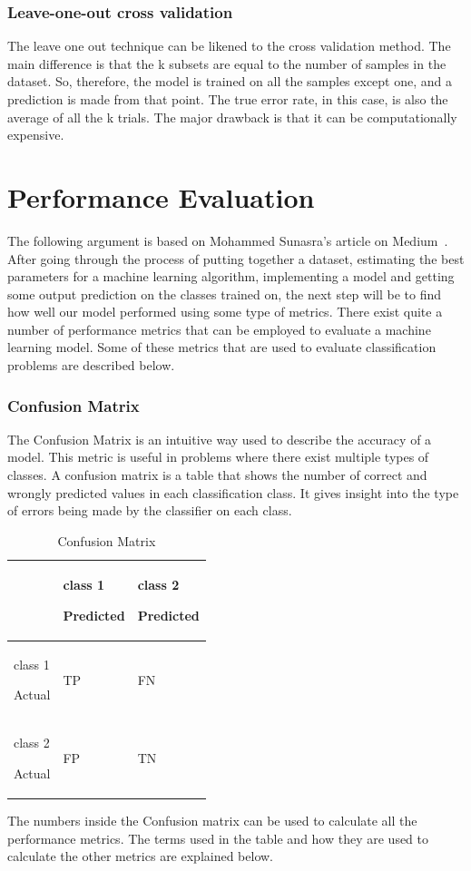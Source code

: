 \documentclass[12pt, a4paper,oneside]{report}
\begin{document}
\subsubsection{Leave-one-out cross validation}
The leave one out technique can be likened to the cross validation method. The main difference is that the k subsets are equal to the number of samples in the dataset. So, therefore, the model is trained on all the samples except one, and a prediction is made from that point. The true error rate, in this case, is also the average of all the k trials. The major drawback is that it can be computationally expensive.


\section{Performance Evaluation}
The following argument is based on Mohammed Sunasra's article on Medium~\cite{performance}.
After going through the process of putting together a dataset, estimating the best parameters for a machine learning algorithm, implementing a model and getting some output prediction on the classes trained on, the next step will be to find how well our model performed using some type of metrics. There exist quite a number of performance metrics that can be employed to evaluate a machine learning model. Some of these metrics that are used to evaluate classification problems are described below.

\subsubsection{Confusion Matrix}
The Confusion Matrix is an intuitive way used to describe the accuracy of a model. This metric is useful in problems where there exist multiple types of classes. A confusion matrix is a table that shows the number of correct and wrongly predicted values in each classification class. It gives insight into the type of errors being made by the classifier on each class.


\begin{table}[h]
	\centering {} \small
	\begin{tabular}{|p{3cm}|p{3cm}|p{3cm}|}
		\hline
		  & class 1 \par Predicted & class 2 \par Predicted \\ \hline
		class 1 \par Actual & TP & FN \\ \hline
		class 2 \par Actual & FP & TN \\ \hline
			
	\end{tabular}
	\caption {Confusion Matrix}	
	\label{table:confusion}
	\end{table}
The numbers inside the Confusion matrix can be used to calculate 
all the performance metrics. The terms used in the table and how they are used to calculate the other metrics are explained below.
\end{document}
